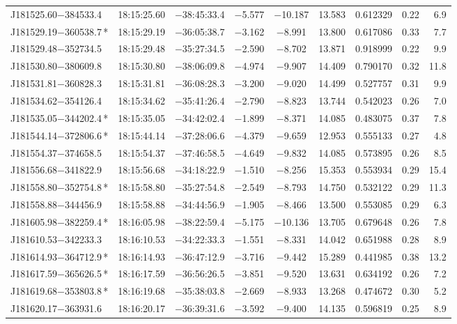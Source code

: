 \begin{table*}
\begin{tabular}{lcccccccr}
J181525.60$-$384533.4 & 18:15:25.60 & $-$38:45:33.4 & $-$5.577 & $-$10.187 & 13.583 & 0.612329 & 0.22 & 6.9 \\
J181529.19$-$360538.7\,* & 18:15:29.19 & $-$36:05:38.7 & $-$3.162 & $-$8.991 & 13.800 & 0.617086 & 0.33 & 7.7 \\
J181529.48$-$352734.5 & 18:15:29.48 & $-$35:27:34.5 & $-$2.590 & $-$8.702 & 13.871 & 0.918999 & 0.22 & 9.9 \\
J181530.80$-$380609.8 & 18:15:30.80 & $-$38:06:09.8 & $-$4.974 & $-$9.907 & 14.409 & 0.790170 & 0.32 & 11.8 \\
J181531.81$-$360828.3 & 18:15:31.81 & $-$36:08:28.3 & $-$3.200 & $-$9.020 & 14.499 & 0.527757 & 0.31 & 9.9 \\
J181534.62$-$354126.4 & 18:15:34.62 & $-$35:41:26.4 & $-$2.790 & $-$8.823 & 13.744 & 0.542023 & 0.26 & 7.0 \\
J181535.05$-$344202.4\,* & 18:15:35.05 & $-$34:42:02.4 & $-$1.899 & $-$8.371 & 14.085 & 0.483075 & 0.37 & 7.8 \\
J181544.14$-$372806.6\,* & 18:15:44.14 & $-$37:28:06.6 & $-$4.379 & $-$9.659 & 12.953 & 0.555133 & 0.27 & 4.8 \\
J181554.37$-$374658.5 & 18:15:54.37 & $-$37:46:58.5 & $-$4.649 & $-$9.832 & 14.085 & 0.573895 & 0.26 & 8.5 \\
J181556.68$-$341822.9 & 18:15:56.68 & $-$34:18:22.9 & $-$1.510 & $-$8.256 & 15.353 & 0.553934 & 0.29 & 15.4 \\
J181558.80$-$352754.8\,* & 18:15:58.80 & $-$35:27:54.8 & $-$2.549 & $-$8.793 & 14.750 & 0.532122 & 0.29 & 11.3 \\
J181558.88$-$344456.9 & 18:15:58.88 & $-$34:44:56.9 & $-$1.905 & $-$8.466 & 13.500 & 0.553085 & 0.29 & 6.3 \\
J181605.98$-$382259.4\,* & 18:16:05.98 & $-$38:22:59.4 & $-$5.175 & $-$10.136 & 13.705 & 0.679648 & 0.26 & 7.8 \\
J181610.53$-$342233.3 & 18:16:10.53 & $-$34:22:33.3 & $-$1.551 & $-$8.331 & 14.042 & 0.651988 & 0.28 & 8.9 \\
J181614.93$-$364712.9\,* & 18:16:14.93 & $-$36:47:12.9 & $-$3.716 & $-$9.442 & 15.289 & 0.441985 & 0.38 & 13.2 \\
J181617.59$-$365626.5\,* & 18:16:17.59 & $-$36:56:26.5 & $-$3.851 & $-$9.520 & 13.631 & 0.634192 & 0.26 & 7.2 \\
J181619.68$-$353803.8\,* & 18:16:19.68 & $-$35:38:03.8 & $-$2.669 & $-$8.933 & 13.268 & 0.474672 & 0.30 & 5.2 \\
J181620.17$-$363931.6 & 18:16:20.17 & $-$36:39:31.6 & $-$3.592 & $-$9.400 & 14.135 & 0.596819 & 0.25 & 8.9 \\

\end{tabular}
\end{table*}
